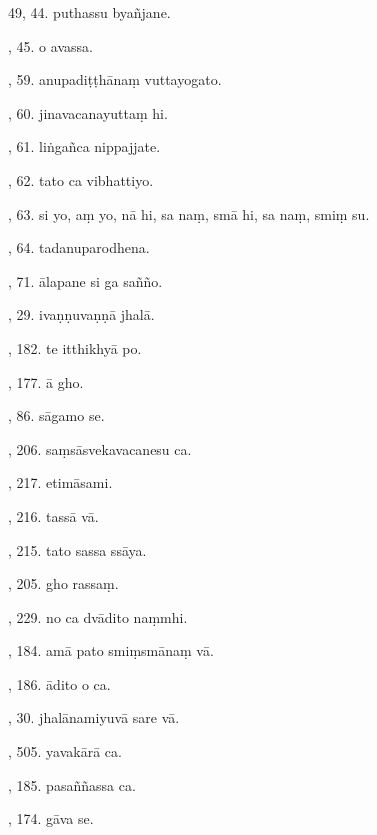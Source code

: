 49, 44. puthassu byañjane.\hfill \pageref{sut:49}\par {}, 45. o avassa.\hfill \pageref{sut:50}\par {}, 59. anupadiṭṭhānaṃ vuttayogato.\hfill \pageref{sut:51}\par {}, 60. jinavacanayuttaṃ hi.\hfill \pageref{sut:52}\par {}, 61. liṅgañca nippajjate.\hfill \pageref{sut:53}\par {}, 62. tato ca vibhattiyo.\hfill \pageref{sut:54}\par {}, 63. si yo, aṃ yo, nā hi, sa naṃ, smā hi, sa naṃ, smiṃ su.\par \noindent
\hfill \pageref{sut:55}\par {}, 64. tadanuparodhena.\hfill \pageref{sut:56}\par {}, 71. ālapane si ga sañño.\hfill \pageref{sut:57}\par {}, 29. ivaṇṇuvaṇṇā jhalā.\hfill \pageref{sut:58}\par {}, 182. te itthikhyā po.\hfill \pageref{sut:59}\par {}, 177. ā gho.\hfill \pageref{sut:60}\par {}, 86. sāgamo se.\hfill \pageref{sut:61}\par {}, 206. saṃsāsvekavacanesu ca.\hfill \pageref{sut:62}\par {}, 217. etimāsami.\hfill \pageref{sut:63}\par {}, 216. tassā vā.\hfill \pageref{sut:64}\par {}, 215. tato sassa ssāya.\hfill \pageref{sut:65}\par {}, 205. gho rassaṃ.\hfill \pageref{sut:66}\par {}, 229. no ca dvādito naṃmhi.\hfill \pageref{sut:67}\par {}, 184. amā pato smiṃsmānaṃ vā.\hfill \pageref{sut:68}\par {}, 186. ādito o ca.\hfill \pageref{sut:69}\par {}, 30. jhalānamiyuvā sare vā.\hfill \pageref{sut:70}\par {}, 505. yavakārā ca.\hfill \pageref{sut:71}\par {}, 185. pasaññassa ca.\hfill \pageref{sut:72}\par {}, 174. gāva se.\hfill \pageref{sut:73}\par \noindent
